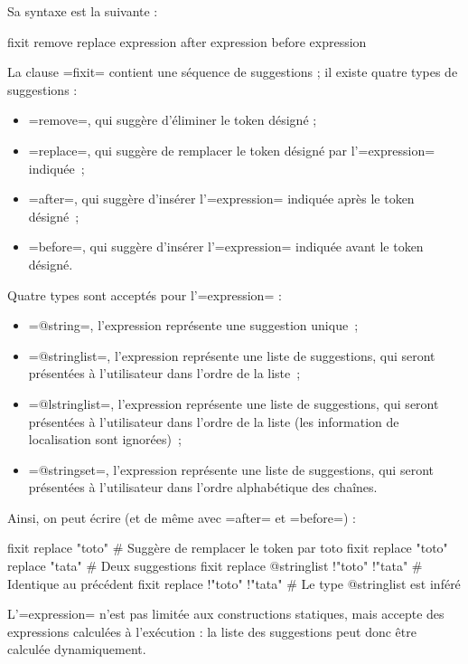 Sa syntaxe est la suivante :

\begin{galgas}
fixit {
  remove
  replace expression
  after expression
  before expression
}
\end{galgas}

La clause \ggs=fixit= contient une séquence de suggestions ; il existe quatre types de suggestions :
\begin{itemize}
\item \ggs=remove=, qui suggère d'éliminer le token désigné ;
\item \ggs=replace=, qui suggère de remplacer le token désigné par l'\ggs=expression= indiquée~;
\item \ggs=after=, qui suggère d'insérer l'\ggs=expression= indiquée après le token désigné~;
\item \ggs=before=, qui suggère d'insérer l'\ggs=expression= indiquée avant le token désigné.
\end{itemize}

Quatre types sont acceptés pour l'\ggs=expression= :
\begin{itemize}
  \item \ggs=@string=, l'expression représente une suggestion unique~;
  \item \ggs=@stringlist=, l'expression représente une liste de suggestions, qui seront présentées à l'utilisateur dans l'ordre de la liste~;
  \item \ggs=@lstringlist=, l'expression représente une liste de suggestions, qui seront présentées à l'utilisateur dans l'ordre de la liste (les information de localisation sont ignorées)~;
  \item \ggs=@stringset=, l'expression représente une liste de suggestions, qui seront présentées à l'utilisateur dans l'ordre alphabétique des chaînes.
\end{itemize}

Ainsi, on peut écrire (et de même avec \ggs=after= et \ggs=before=) :
\begin{galgas}
fixit { replace "toto" } # Suggère de remplacer le token par toto
fixit { replace "toto" replace "tata" } # Deux suggestions
fixit { replace @stringlist {!"toto" !"tata"} } # Identique au précédent
fixit { replace {!"toto" !"tata"} } # Le type @stringlist est inféré
\end{galgas}


L'\ggs=expression= n'est pas limitée aux constructions statiques, mais accepte des expressions calculées à l'exécution : la liste des suggestions peut donc être calculée dynamiquement.

